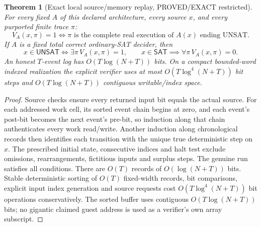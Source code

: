 \documentclass[11pt]{article}
\newtheorem{theorem}{Theorem}
\newcommand{\SAT}{\mathsf{SAT}}
\newcommand{\UNSAT}{\mathsf{UNSAT}}
\begin{document}
\begin{theorem}[Exact local source/memory replay, PROVED/EXACT restricted]\label{th:trace}
For every fixed $A$ of this declared architecture, every source $x$, and every purported finite trace $\pi$:
\[
V_A(x,\pi)=1\iff \pi\text{ is the complete real execution of }A(x)\text{ ending UNSAT}.
\]
If $A$ is a fixed total correct ordinary-SAT decider, then
\[
x\in\UNSAT\iff\exists\pi\,V_A(x,\pi)=1,\qquad
x\in\SAT\implies\forall\pi\,V_A(x,\pi)=0.
\]
An honest $T$-event log has $O(T\log(N+T))$ bits. On a compact bounded-word indexed realization the explicit verifier uses at most $O(T\log^4(N+T))$ bit steps and $O(T\log(N+T))$ contiguous writable/index space.
\end{theorem}
\begin{proof}
Source checks ensure every returned input bit equals the actual source. For each addressed work cell, its sorted event chain begins at zero, and each event's post-bit becomes the next event's pre-bit, so induction along that chain authenticates every work read/write. Another induction along chronological records then identifies each transition with the unique true deterministic step on $x$. The prescribed initial state, consecutive indices and halt test exclude omissions, rearrangements, fictitious inputs and surplus steps. The genuine run satisfies all conditions. There are $O(T)$ records of $O(\log(N+T))$ bits. Stable deterministic sorting of $O(T)$ fixed-width records, bit comparisons, explicit input index generation and source requests cost $O(T\log^4(N+T))$ bit operations conservatively. The sorted buffer uses contiguous $O(T\log(N+T))$ bits; no gigantic claimed guest address is used as a verifier's own array subscript.
\end{proof}
\end{document}
